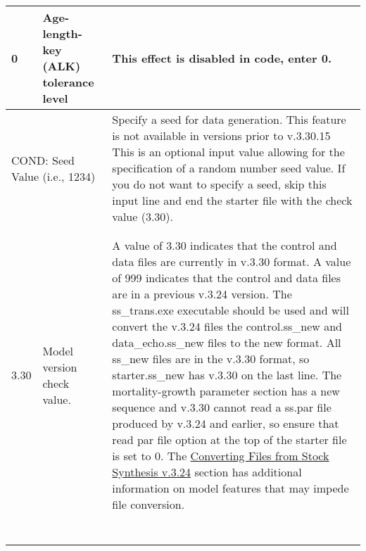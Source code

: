 {\begin{landscape}
\begin{longtable}{p{1.5cm} p{7.2cm} p{12.3cm}}
  \hline
  \hypertarget{ALK}{0} & Age-length-key (ALK) tolerance level & This effect is disabled in code, enter 0. \Tstrut\Bstrut\\
  
  \hline  
  \multicolumn{2}{l}{COND: Seed Value (i.e., 1234)}& \multirow{1}{1cm}[-0.25cm]{\parbox{12.5cm}{Specify a seed for data generation. This feature is not available in versions prior to v.3.30.15 This is an optional input value allowing for the specification of a random number seed value. If you do not want to specify a seed, skip this input line and end the starter file with the check value (3.30).}} \Tstrut\Bstrut\\
  & & \Bstrut\\ 
  & & \Bstrut\\ 
  
 \hline
 \hypertarget{Convert}{3.30} & Model version check value. & \multirow{1}{1cm}[-0.25cm]{\parbox{12.5cm}{A value of 3.30 indicates that the control and data files are currently in v.3.30 format. A value of 999 indicates that the control and data files are in a previous v.3.24 version. The ss\_trans.exe executable should be used and will convert the v.3.24 files the control.ss\_new and data\_echo.ss\_new files to the new format. All ss\_new files are in the v.3.30 format, so starter.ss\_new has v.3.30 on the last line. The mortality-growth parameter section has a new sequence and v.3.30 cannot read a ss.par file produced by v.3.24 and earlier, so ensure that read par file option at the top of the starter file is set to 0. The \hyperlink{ConvIssues}{Converting Files from Stock Synthesis v.3.24} section has additional information on model features that may impede file conversion.}} \Tstrut\Bstrut\\
     & & \\  
     & & \\  
	   & & \\
     & & \\
   	 & & \\
     & & \\  
     & & \\  

\end{longtable}
\end{landscape}
}
\restoregeometry





\pagebreak
